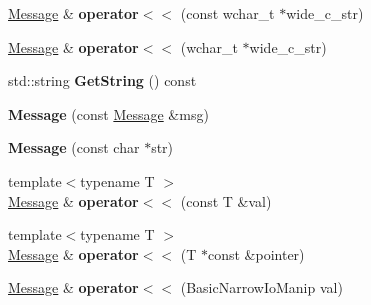 \begin{DoxyCompactItemize}
\item 
\hypertarget{classtesting_1_1_message_a34774e225944cb6df02db9689d312aae}{}\hyperlink{classtesting_1_1_message}{Message} \& {\bfseries operator$<$$<$} (const wchar\+\_\+t $\ast$wide\+\_\+c\+\_\+str)\label{classtesting_1_1_message_a34774e225944cb6df02db9689d312aae}

\item 
\hypertarget{classtesting_1_1_message_aae57eefb3a72a19c11453d630b1d846c}{}\hyperlink{classtesting_1_1_message}{Message} \& {\bfseries operator$<$$<$} (wchar\+\_\+t $\ast$wide\+\_\+c\+\_\+str)\label{classtesting_1_1_message_aae57eefb3a72a19c11453d630b1d846c}

\item 
\hypertarget{classtesting_1_1_message_abe8c1b7584aa670dd0e2413e8317a937}{}std\+::string {\bfseries Get\+String} () const \label{classtesting_1_1_message_abe8c1b7584aa670dd0e2413e8317a937}

\item 
\hypertarget{classtesting_1_1_message_ac126e24804817a053bebba0920d94a11}{}{\bfseries Message} (const \hyperlink{classtesting_1_1_message}{Message} \&msg)\label{classtesting_1_1_message_ac126e24804817a053bebba0920d94a11}

\item 
\hypertarget{classtesting_1_1_message_a9de694ca239486809fc99fbbea8ac21d}{}{\bfseries Message} (const char $\ast$str)\label{classtesting_1_1_message_a9de694ca239486809fc99fbbea8ac21d}

\item 
\hypertarget{classtesting_1_1_message_a2e0e71be52d54c20a75a55fca812721f}{}{\footnotesize template$<$typename T $>$ }\\\hyperlink{classtesting_1_1_message}{Message} \& {\bfseries operator$<$$<$} (const T \&val)\label{classtesting_1_1_message_a2e0e71be52d54c20a75a55fca812721f}

\item 
\hypertarget{classtesting_1_1_message_aa3ab685879958f90d2d8cd5b68d10c34}{}{\footnotesize template$<$typename T $>$ }\\\hyperlink{classtesting_1_1_message}{Message} \& {\bfseries operator$<$$<$} (T $\ast$const \&pointer)\label{classtesting_1_1_message_aa3ab685879958f90d2d8cd5b68d10c34}

\item 
\hypertarget{classtesting_1_1_message_a3a71a1c1c8ea52de5852d75483d41453}{}\hyperlink{classtesting_1_1_message}{Message} \& {\bfseries operator$<$$<$} (Basic\+Narrow\+Io\+Manip val)\label{classtesting_1_1_message_a3a71a1c1c8ea52de5852d75483d41453}


\end{DoxyCompactItemize}
